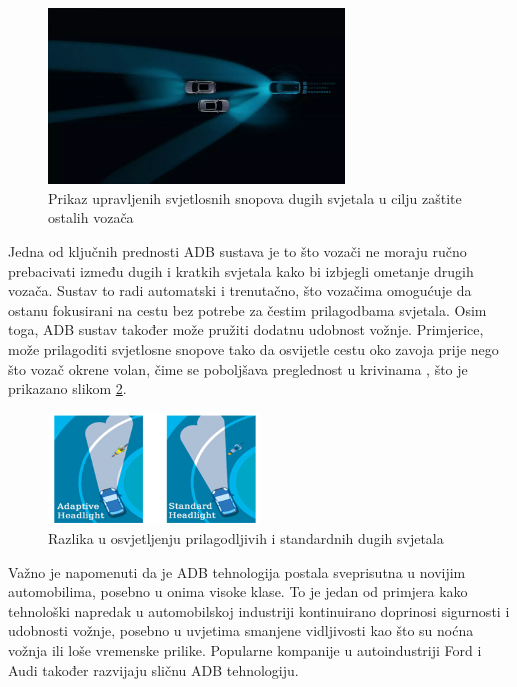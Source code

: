 \documentclass{foi}
\begin{document}
\begin{figure}[h!]
    \centering
    \includegraphics[width=0.7\textwidth]{slike/adb2}
    \caption{Prikaz upravljenih svjetlosnih snopova dugih svjetala u cilju zaštite ostalih vozača \cite{Sakalas2021}}
    \label{fig:adb2}
\end{figure}

Jedna od ključnih prednosti ADB sustava je to što vozači ne moraju ručno prebacivati između dugih i kratkih svjetala kako bi izbjegli ometanje drugih vozača. Sustav to radi automatski i trenutačno, što vozačima omogućuje da ostanu fokusirani na cestu bez potrebe za čestim prilagodbama svjetala. Osim toga, ADB sustav također može pružiti dodatnu udobnost vožnje. Primjerice, može prilagoditi svjetlosne snopove tako da osvijetle cestu oko zavoja prije nego što vozač okrene volan, čime se poboljšava preglednost u krivinama \cite{Brahmbhatt2022}, što je prikazano slikom \ref{fig:adb3}.

\begin{figure}[h!]
    \centering
    \includegraphics[width=0.5\textwidth]{slike/adb3}
    \caption{Razlika u osvjetljenju prilagodljivih i standardnih dugih svjetala \cite{Brahmbhatt2022}}
    \label{fig:adb3}
\end{figure}

Važno je napomenuti da je ADB tehnologija postala sveprisutna u novijim automobilima, posebno u onima visoke klase. To je jedan od primjera kako tehnološki napredak u automobilskoj industriji kontinuirano doprinosi sigurnosti i udobnosti vožnje, posebno u uvjetima smanjene vidljivosti kao što su noćna vožnja ili loše vremenske prilike. Popularne kompanije u autoindustriji Ford i Audi također razvijaju sličnu ADB tehnologiju. \cite{ElectronicSpecifier2016}
\end{document}
